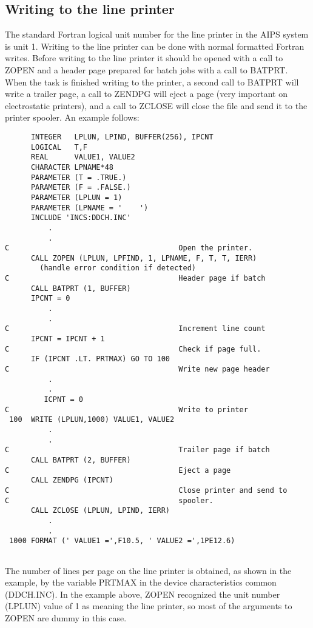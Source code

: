 \subsection{Writing to the line printer}
 The standard Fortran logical unit number for the line printer in the
AIPS system is unit 1.  Writing to the line printer can be done with
normal formatted Fortran writes.  Before writing to the line printer
it should be opened with a call to ZOPEN and a header page prepared
for batch jobs with a call to BATPRT.  When the task is finished
writing to the printer, a second call to BATPRT will write a trailer
page, a call to ZENDPG will eject a page (very important on
electrostatic printers), and a call to ZCLOSE will close the file and
send it to the printer spooler.  An example follows:
\begin{verbatim}
      INTEGER   LPLUN, LPIND, BUFFER(256), IPCNT
      LOGICAL   T,F
      REAL      VALUE1, VALUE2
      CHARACTER LPNAME*48
      PARAMETER (T = .TRUE.)
      PARAMETER (F = .FALSE.)
      PARAMETER (LPLUN = 1)
      PARAMETER (LPNAME = '    ')
      INCLUDE 'INCS:DDCH.INC'
          .
          .
C                                       Open the printer.
      CALL ZOPEN (LPLUN, LPFIND, 1, LPNAME, F, T, T, IERR)
        (handle error condition if detected)
C                                       Header page if batch
      CALL BATPRT (1, BUFFER)
      IPCNT = 0
          .
          .
C                                       Increment line count
      IPCNT = IPCNT + 1
C                                       Check if page full.
      IF (IPCNT .LT. PRTMAX) GO TO 100
C                                       Write new page header
          .
          .
         ICPNT = 0
C                                       Write to printer
 100  WRITE (LPLUN,1000) VALUE1, VALUE2
          .
          .
C                                       Trailer page if batch
      CALL BATPRT (2, BUFFER)
C                                       Eject a page
      CALL ZENDPG (IPCNT)
C                                       Close printer and send to
C                                       spooler.
      CALL ZCLOSE (LPLUN, LPIND, IERR)
          .
          .
 1000 FORMAT (' VALUE1 =',F10.5, ' VALUE2 =',1PE12.6)


\end{verbatim}
 The number of lines per page on the line printer is obtained, as
shown in the example, by the variable PRTMAX in the device
characteristics common (DDCH.INC).  In the example above,
ZOPEN recognized the unit number (LPLUN) value of 1 as meaning the
line printer, so most of the arguments to ZOPEN are dummy in this
case.

